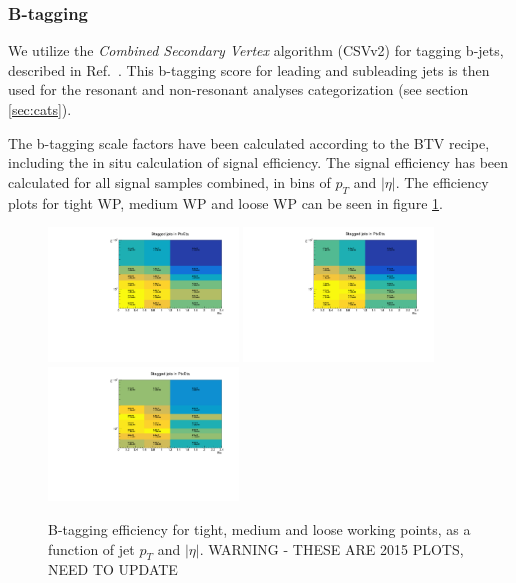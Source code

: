 \subsubsection{B-tagging}
\label{sec:btag}

We utilize the \textit{Combined Secondary Vertex} algorithm (CSVv2) for tagging b-jets,
described in Ref.~\cite{btag-twiki}. This b-tagging score for leading and subleading jets is then used for the resonant and non-resonant analyses categorization (see section \ref{sec:cats}).

The b-tagging scale factors have been calculated according to the BTV recipe, including the in situ calculation of signal efficiency.
The signal efficiency has been calculated for all signal samples combined, in bins of $p_{T}$ and $|\eta|$.
The efficiency plots for tight WP, medium WP and loose WP can be seen in figure \ref{fig:btageff}.

\begin{figure}[thb]
  \centering
  \includegraphics[width=0.45\textwidth]{figures/sec-jets/btageff_tight.pdf}\hfil
  \includegraphics[width=0.45\textwidth]{figures/sec-jets/btageff_medium.pdf}\hfil
  \includegraphics[width=0.45\textwidth]{figures/sec-jets/btageff_loose.pdf}\hfil 
  \caption{B-tagging efficiency for tight, medium and loose working points, as a function of jet $p_{T}$ and $|\eta|$. WARNING - THESE ARE 2015 PLOTS, NEED TO UPDATE}
  \label{fig:btageff}
\end{figure}

